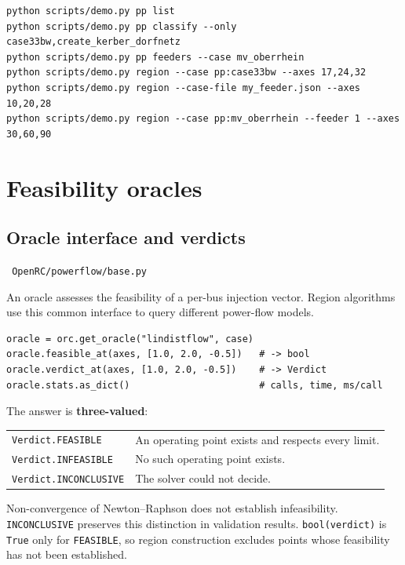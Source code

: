 \documentclass[11pt,a4paper]{report}
\newcommand{\why}[1]{\par\medskip\begingroup\noindent #1\par\endgroup\medskip}
\newcommand{\code}[1]{\texttt{\small #1}}
\newcommand{\file}[1]{\texttt{\small\color{nbgrey} #1}}
\begin{document}
\begin{lstlisting}[style=sh]
python scripts/demo.py pp list
python scripts/demo.py pp classify --only case33bw,create_kerber_dorfnetz
python scripts/demo.py pp feeders --case mv_oberrhein
python scripts/demo.py region --case pp:case33bw --axes 17,24,32
python scripts/demo.py region --case-file my_feeder.json --axes 10,20,28
python scripts/demo.py region --case pp:mv_oberrhein --feeder 1 --axes 30,60,90
\end{lstlisting}


\chapter{Feasibility oracles}
\label{ch:oracles}

\section{Oracle interface and verdicts}

\file{OpenRC/powerflow/base.py}

An oracle assesses the feasibility of a per-bus injection vector. Region
algorithms use this common interface to query different power-flow models.

\begin{lstlisting}
oracle = orc.get_oracle("lindistflow", case)
oracle.feasible_at(axes, [1.0, 2.0, -0.5])   # -> bool
oracle.verdict_at(axes, [1.0, 2.0, -0.5])    # -> Verdict
oracle.stats.as_dict()                       # calls, time, ms/call
\end{lstlisting}

The answer is \textbf{three-valued}:

\begin{center}\small
\begin{tabular}{@{}lp{9.6cm}@{}}
\toprule
\code{Verdict.FEASIBLE} & An operating point exists and respects every limit. \\
\code{Verdict.INFEASIBLE} & No such operating point exists. \\
\code{Verdict.INCONCLUSIVE} & The solver could not decide. \\
\bottomrule
\end{tabular}
\end{center}

\why{Non-convergence of Newton--Raphson does not establish infeasibility.
\code{INCONCLUSIVE} preserves this distinction in validation results.
\code{bool(verdict)} is \code{True} only for \code{FEASIBLE}, so region
construction excludes points whose feasibility has not been established.}
\end{document}
